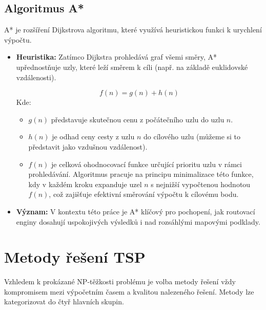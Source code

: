 \subsection{Algoritmus A*}
A* je rozšíření Dijkstrova algoritmu, které využívá heuristickou funkci k urychlení výpočtu.
\begin{itemize}
    \item \textbf{Heuristika:} Zatímco Dijkstra prohledává graf všemi směry, A* upřednostňuje uzly, které leží směrem k cíli (např. na základě euklidovské vzdálenosti).

\begin{equation}
\label{eq:a_star}
f(n) = g(n) + h(n)
\end{equation}
Kde:
\begin{itemize}
    \item $g(n)$ představuje skutečnou cenu z počátečního uzlu do uzlu $n$.
    \item $h(n)$ je odhad ceny cesty z uzlu $n$ do cílového uzlu (můžeme si to představit jako vzdušnou vzdálenost).
\item $f(n)$ je celková ohodnocovací funkce určující prioritu uzlu v rámci prohledávání. Algoritmus pracuje na principu minimalizace této funkce, kdy v každém kroku expanduje uzel $n$ s nejnižší vypočtenou hodnotou $f(n)$, což zajišťuje efektivní směrování výpočtu k cílovému bodu.
\end{itemize}
    \item \textbf{Význam:} V kontextu této práce je A* klíčový pro pochopení, jak routovací enginy dosahují uspokojivých výsledků i nad rozsáhlými mapovými podklady.
\end{itemize}





\section{Metody řešení TSP} %
Vzhledem k prokázané NP-těžkosti problému je volba metody řešení vždy kompromisem mezi výpočetním časem a kvalitou nalezeného řešení. Metody lze kategorizovat do čtyř hlavních skupin.

